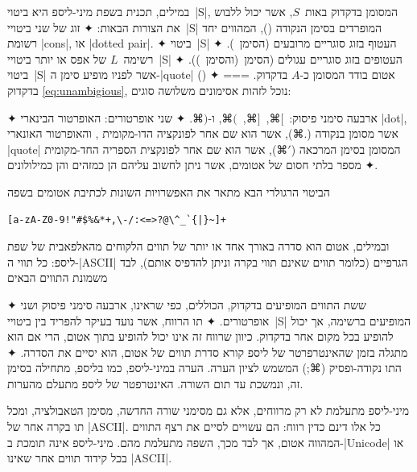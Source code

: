 במילים, תכנית בשפת מיני-ליספ היא ביטוי~\E|S|, המסומן בדקדוק באות~$S$, אשר יכול
ללבוש את הצורות הבאות:
✦ זוג של שני ביטויי~\E|S| המופרדים בסימן הנקודה (), המהווים יחד רשומת
  \E|cons|, או \E|dotted pair|.
✦ ביטוי~\E|S| העטוף בזוג סוגריים מרובעים (הסימן~\cc[ והסימן~\cc]).
✦ רשימה~$L$ של אפס או יותר ביטויי~\E|S| העטופים בזוג סוגריים עגולים (הסימן~\cc(והסימן~\cc)).
✦ ביטוי~\E|S| אשר לפניו מופיע סימן ה-\E|quote| ()
✦ אטום בודד המסומן כ-$A$ בדקדוק.
===
בדקדוק \cref{eq:unambigious}, נוכל לזהות אסימונים משלושה סוגים:
\begin{enumerate}
✦ ארבעה סימני פיסוק:~$⌘[$,~$⌘]$,~$⌘($, ו-$⌘)$.
✦ שני אופרטורים: האופרטור הבינארי \E|dot|, אשר מסומן בנקודה ($⌘.$), אשר
  הוא שם אחר לפונקציה הדו-מקומית , והאופרטור האונארי \E|quote|
  המסומן בסימן המרכאה ($⌘'$), אשר הוא שם אחר לפונקצית הספריה החד-מקומית 
✦ מספר בלתי חסום של אטומים, אשר ניתן לחשוב עליהם הן כמזהים והן כמילולונים.
\end{enumerate}

הביטוי הרגולרי הבא מתאר את האפשרויות השונות לכתיבת אטומים בשפה
\begin{LTR}
\begin{verbatim}
[a-zA-Z0-9!"#$%&*+,\-/:<=>?@\^_`{|}~]+
\end{verbatim}
\end{LTR}

ובמילים, אטום הוא סדרה באורך אחד או יותר של תווים הלקוחים מהאלפאבית של שפת ליספ:
כל תווי ה-\E|ASCII| הגרפיים (כלומר תווים שאינם תווי בקרה וניתן להדפיס אותם),
לבד משמונת התווים הבאים \begin{itemize}
    ✦ ששת התווים המופיעים בדקדוק, הכוללים, כפי שראינו, ארבעה סימני פיסוק ושני אופרטורים.
    ✦ תו הרווח, אשר נועד בעיקר להפריד בין ביטויי~\E|S| המופיעים ברשימה, אך יכול
    להופיע בכל מקום אחר בדקדוק. כיוון שרווח זה אינו יכול להופיע בתוך אטום, הרי
    אם הוא מתגלה בזמן שהאינטרפרטר של ליספ קורא סדרת תווים של אטום, הוא יסיים את
    הסדרה.
    ✦ התו נקודה-ופסיק (⌘;) המשמש לציון הערה. הערה במיני-ליספ, כמו בליספ, מתחילה
    בסימן זה, ונמשכת עד תום השורה. האינטרפטר של ליספ מתעלם מהערות.
\end{itemize}
    מיני-ליספ מתעלמת לא רק מרווחים, אלא גם מסימני שורה החדשה, מסימן הטאבולציה,
    ומכל תו בקרה אחר של \E|ASCII|. כל אלו דינם כדין רווח: הם עשויים לסיים את רצף
    התווים המהווה אטום, אך לבד מכך, השפה מתעלמת מהם. מיני-ליספ אינה תומכת
    ב-\E|Unicode| או בכל קידוד תווים אחר שאינו \E|ASCII|.

